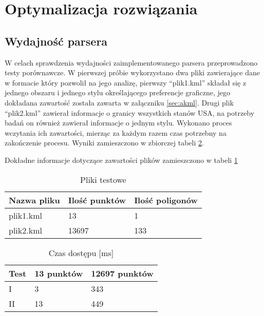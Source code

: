 ﻿\clearpage
\newpage
\section{Optymalizacja rozwiązania}
\label{sec:optymalizacja}
 

\subsection{Wydajność parsera}
\label{subsec:wydajnosc}

W celach sprawdzenia wydajności zaimplementowanego parsera przeprowadzono testy porównawcze. W pierwszej próbie wykorzystano dwa pliki zawierające dane w formacie który pozwolił na jego analizę, pierwszy ``plik1.kml''  składał się z jednego obszaru i jednego stylu określającego preferencje graficzne, jego dokładana zawartość została zawarta w załączniku \ref{sec:akml}. Drugi plik ``plik2.kml'' zawierał informacje o granicy wszystkich stanów USA, na potrzeby badań on również zawierał informacje o jednym stylu.
Wykonano proces wczytania ich zawartości, mierząc za każdym razem czas potrzebny na zakończenie procesu. Wyniki zamieszczono w zbiorczej tabeli \ref{tab:speedTest}.

Dokładne informacje dotyczące zawartości plików zamieszczono w tabeli \ref{tab:testFile}

\begin{table}[H]
    \centering
    \begin{tabular}{|l|l|l|}
    \hline
    Nazwa pliku & Ilość punktów & Ilość poligonów \\ \hline
    plik1.kml & 13 & 1 \\ \hline
    plik2.kml & 13697 & 133 \\ \hline

    \end{tabular}
    \caption{Pliki testowe}
    \label{tab:testFile}
\end{table}


\begin{table} [H]
    \centering
    \begin{tabular}{|l|l|l|}
    \hline
    Test & 13 punktów & 12697 punktów \\\hline
    I & 3 & 343 \\\hline
    II & 13 & 449 \\\hline

    \end{tabular}
    \caption{Czas dostępu [ms]}
    \label{tab:speedTest}
\end{table}

